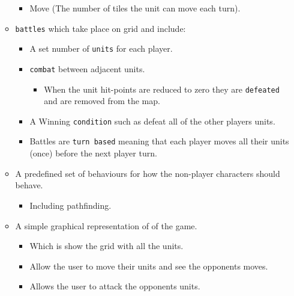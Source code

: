 \begin{itemize}
\begin{itemize}
\begin{itemize}
		\item Move (The number of tiles the unit can move each turn).
	\end{itemize}
	
	\item \texttt{battles} which take place on grid and include:
	\begin{itemize}
		\item A set number of \texttt{units} for each player.
		
		\item \texttt{combat} between adjacent units.
		\begin{itemize}
			\item When the unit hit-points are reduced to zero they are \texttt{defeated} and are removed from the map.
		\end{itemize}
		
		\item A Winning \texttt{condition} such as defeat all of the other players units.
		
		\item Battles are \texttt{turn based} meaning that each player moves all their units (once) before the next player turn.
	\end{itemize}
	
	\item A predefined set of behaviours for how the non-player characters should behave.
	\begin{itemize}
		\item Including pathfinding.
	\end{itemize}
	
	\item A simple graphical representation of of the game.
	\begin{itemize}
		\item Which is show the grid with all the units.
		
		\item Allow the user to move their units and see the opponents moves.
		
		\item Allows the user to attack the opponents units.
	\end{itemize}
\end{itemize}
\end{itemize}

